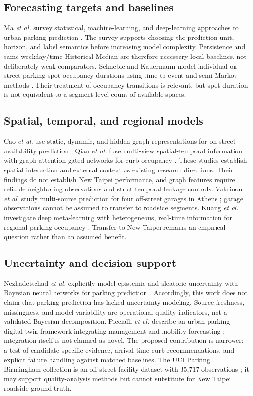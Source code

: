 \documentclass[conference,letterpaper,10pt]{IEEEtran}
\begin{document}
\subsection{Forecasting targets and baselines}
Ma \emph{et al.} survey statistical, machine-learning, and deep-learning approaches to urban parking prediction \cite{ma2024}. The survey supports choosing the prediction unit, horizon, and label semantics before increasing model complexity. Persistence and same-weekday/time Historical Median are therefore necessary local baselines, not deliberately weak comparators. Schneble and Kauermann model individual on-street parking-spot occupancy durations using time-to-event and semi-Markov methods \cite{schneble2025}. Their treatment of occupancy transitions is relevant, but spot duration is not equivalent to a segment-level count of available spaces.

\subsection{Spatial, temporal, and regional models}
Cao \emph{et al.} use static, dynamic, and hidden graph representations for on-street availability prediction \cite{cao2025}; Qian \emph{et al.} fuse multi-view spatial-temporal information with graph-attention gated networks for curb occupancy \cite{qian2025}. These studies establish spatial interaction and external context as existing research directions. Their findings do not establish New Taipei performance, and graph features require reliable neighboring observations and strict temporal leakage controls. Vakrinou \emph{et al.} study multi-source prediction for four off-street garages in Athens \cite{vakrinou2026}; garage observations cannot be assumed to transfer to roadside segments. Kuang \emph{et al.} investigate deep meta-learning with heterogeneous, real-time information for regional parking occupancy \cite{kuang2025}. Transfer to New Taipei remains an empirical question rather than an assumed benefit.

\subsection{Uncertainty and decision support}
Nezhadettehad \emph{et al.} explicitly model epistemic and aleatoric uncertainty with Bayesian neural networks for parking prediction \cite{nezhadettehad2025}. Accordingly, this work does not claim that parking prediction has lacked uncertainty modeling. Source freshness, missingness, and model variability are operational quality indicators, not a validated Bayesian decomposition. Piccialli \emph{et al.} describe an urban parking digital-twin framework integrating management and mobility forecasting \cite{piccialli2025}; integration itself is not claimed as novel. The proposed contribution is narrower: a test of candidate-specific evidence, arrival-time curb recommendations, and explicit failure handling against matched baselines. The UCI Parking Birmingham collection is an off-street facility dataset with 35,717 observations \cite{stolfi2017}; it may support quality-analysis methods but cannot substitute for New Taipei roadside ground truth.
\end{document}

